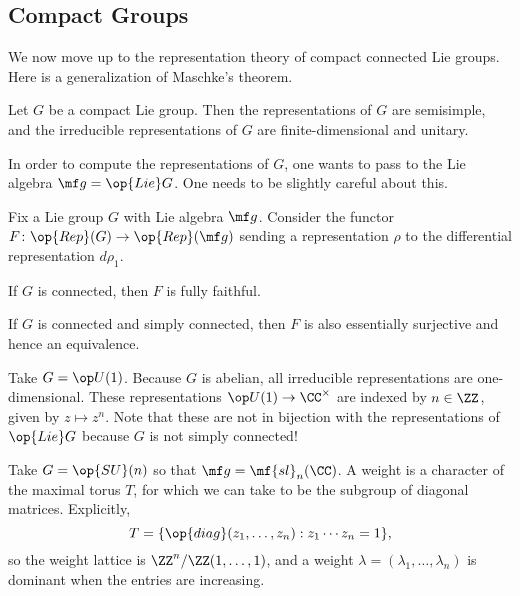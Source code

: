 \documentclass[../notes.tex]{subfiles}
\begin{document}
\subsection{Compact Groups}
We now move up to the representation theory of compact connected Lie groups. Here is a generalization of Maschke's theorem.
\begin{theorem}
	Let $G$ be a compact Lie group. Then the representations of $G$ are semisimple, and the irreducible representations of $G$ are finite-dimensional and unitary.
\end{theorem}
In order to compute the representations of $G$, one wants to pass to the Lie algebra $\mf g=\op{Lie}G$. One needs to be slightly careful about this.
\begin{proposition}
	Fix a Lie group $G$ with Lie algebra $\mf g$. Consider the functor $F\colon\op{Rep}(G)\to\op{Rep}(\mf g)$ sending a representation $\rho$ to the differential representation $d\rho_1$.
	\begin{listalph}
		\item If $G$ is connected, then $F$ is fully faithful.
		\item If $G$ is connected and simply connected, then $F$ is also essentially surjective and hence an equivalence.
	\end{listalph}
\end{proposition}
\begin{example}
	Take $G=\op U(1)$. Because $G$ is abelian, all irreducible representations are one-dimensional. These representations $\op U(1)\to\CC^\times$ are indexed by $n\in\ZZ$, given by $z\mapsto z^n$. Note that these are not in bijection with the representations of $\op{Lie}G$ because $G$ is not simply connected!
\end{example}
\begin{example}
	Take $G=\op{SU}(n)$ so that $\mf g=\mf{sl}_n(\CC)$. A weight is a character of the maximal torus $T$, for which we can take to be the subgroup of diagonal matrices. Explicitly,
	\[T=\{\op{diag}(z_1,\ldots,z_n):z_1\cdots z_n=1\},\]
	so the weight lattice is $\ZZ^n/\ZZ(1,\ldots,1)$, and a weight $\lambda=(\lambda_1,\ldots,\lambda_n)$ is dominant when the entries are increasing.
\end{example}
\end{document}
